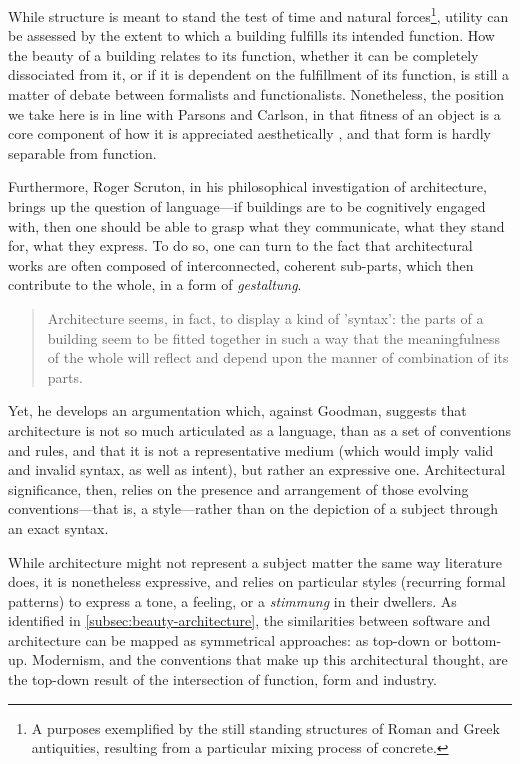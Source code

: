 While structure is meant to stand the test of time and natural forces\footnote{A purposes exemplified by the still standing structures of Roman and Greek antiquities, resulting from a particular mixing process of concrete.}, utility can be assessed by the extent to which a building fulfills its intended function. How the beauty of a building relates to its function, whether it can be completely dissociated from it, or if it is dependent on the fulfillment of its function, is still a matter of debate between formalists and functionalists. Nonetheless, the position we take here is in line with Parsons and Carlson, in that fitness of an object is a core component of how it is appreciated aesthetically \citep{parsons_functional_2012}, and that form is hardly separable from function.

Furthermore, Roger Scruton, in his philosophical investigation of architecture, brings up the question of language—if buildings are to be cognitively engaged with, then one should be able to grasp what they communicate, what they stand for, what they express. To do so, one can turn to the fact that architectural works are often composed of interconnected, coherent sub-parts, which then contribute to the whole, in a form of \emph{gestaltung}.

\begin{quote}
    Architecture seems, in fact, to display a kind of 'syntax': the parts of a building seem to be fitted together in such a way that the meaningfulness of the whole will reflect and depend upon the manner of combination of its parts. \citep{scruton_aesthetics_2013}
\end{quote}

Yet, he develops an argumentation which, against Goodman, suggests that architecture is not so much articulated as a language, than as a set of conventions and rules, and that it is not a representative medium (which would imply valid and invalid syntax, as well as intent), but rather an expressive one. Architectural significance, then, relies on the presence and arrangement of those evolving conventions—that is, a style—rather than on the depiction of a subject through an exact syntax.

While architecture might not represent a subject matter the same way literature does, it is nonetheless expressive, and relies on particular styles (recurring formal patterns) to express a tone, a feeling, or a \emph{stimmung} in their dwellers. As identified in \ref{subsec:beauty-architecture}, the similarities between software and architecture can be mapped as symmetrical approaches: as top-down or bottom-up. Modernism, and the conventions that make up this architectural thought, are the top-down result of the intersection of function, form and industry.

